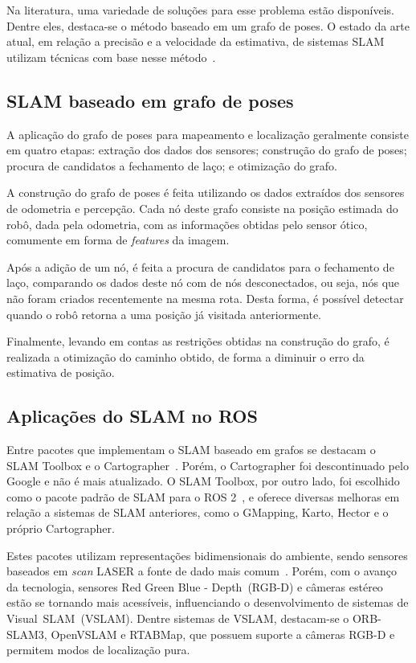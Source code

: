 \documentclass[repeatfields,xlists,xpacks,oneside,yearsonly]{ufrgscca}
\begin{document}
Na literatura, uma variedade de soluções para esse problema estão
disponíveis. Dentre eles, destaca-se o método baseado em um grafo de
poses. O estado da arte atual, em relação a precisão e a velocidade
da estimativa, de sistemas SLAM utilizam técnicas com base nesse
método~\cite{graph_slam_tutorial}.

\subsection{SLAM baseado em grafo de poses}

A aplicação do grafo de poses para mapeamento e localização
geralmente consiste em quatro etapas: extração dos dados dos
sensores; construção do grafo de poses; procura de candidatos a
fechamento de laço; e otimização do grafo.

A construção do grafo de poses é feita utilizando os dados extraídos
dos sensores de odometria e percepção. Cada nó deste grafo consiste
na posição estimada do robô, dada pela odometria, com as informações
obtidas pelo sensor ótico, comumente em forma de \textit{features} da
imagem.

Após a adição de um nó, é feita a procura de candidatos para o
fechamento de laço, comparando os dados deste nó com de nós
desconectados, ou seja, nós que não foram criados recentemente na
mesma rota. Desta forma, é possível detectar quando o robô retorna a
uma posição já visitada anteriormente.

Finalmente, levando em contas as restrições obtidas na construção do
grafo, é realizada a otimização do caminho obtido, de forma a
diminuir o erro da estimativa de posição.

\subsection{Aplicações do SLAM no ROS}

Entre pacotes que implementam o SLAM baseado em grafos se destacam o
SLAM Toolbox e o Cartographer~\cite{slam_toolbox_art}. Porém, o
Cartographer foi descontinuado pelo Google e não é mais atualizado. O
SLAM Toolbox, por outro lado, foi escolhido como o pacote padrão de
SLAM para o ROS 2~\cite{slam_toolbox_ros_standard}, e oferece
diversas melhoras em relação a sistemas de SLAM anteriores, como o
GMapping, Karto, Hector e o próprio Cartographer.

Estes pacotes utilizam representações bidimensionais do ambiente,
sendo sensores baseados em \textit{scan} LASER a fonte de dado mais
comum~\cite{SensorAndSLAM}. Porém, com o avanço da tecnologia,
sensores Red Green Blue - Depth~(RGB-D) e câmeras estéreo estão se
tornando mais acessíveis, influenciando o desenvolvimento de sistemas
de Visual~SLAM~(VSLAM). Dentre sistemas de VSLAM, destacam-se o
ORB-SLAM3, OpenVSLAM e RTABMap, que possuem suporte a câmeras RGB-D e
permitem modos de localização pura.
\end{document}
